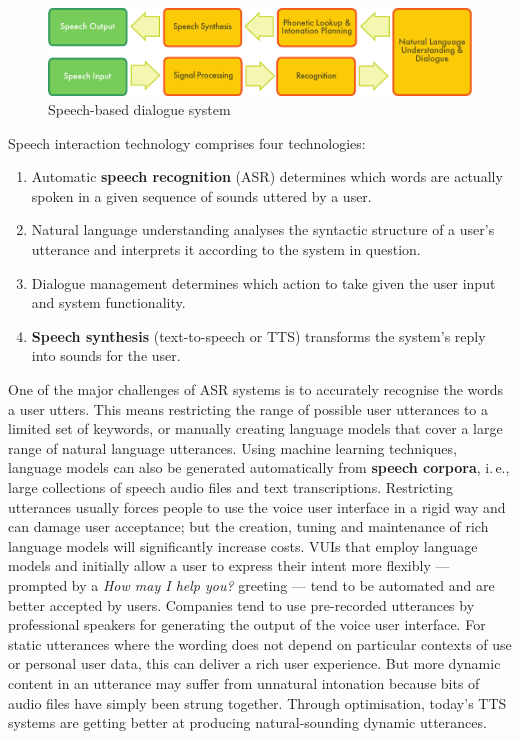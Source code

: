 \documentclass{../../metanetpaper}
\begin{document}
\begin{multicols}{2}
\begin{figure}[htb]
  \center
  \includegraphics[width=\textwidth]{../_media/english/simple_speech-based_dialogue_architecture}
  \caption{Speech-based dialogue system}
  \label{fig:dialoguearch_en}
\end{figure}

Speech interaction technology comprises four technologies: 

\begin{enumerate}
\item Automatic \textbf{speech recognition} (ASR) determines which words are actually spoken in a given sequence of sounds uttered by a user.  
\item Natural language understanding analyses the syntactic structure of a user’s utterance and interprets it according to the system in question.
\item Dialogue management determines which action to take given the user input and system functionality.   
\item \textbf{Speech synthesis} (text-to-speech or TTS) transforms the system’s reply into sounds for the user.
\end{enumerate}

One of the major challenges of ASR systems is to accurately recognise the words a user utters. This means restricting the range of possible user utterances to a limited set of keywords, or manually creating language models that cover a large range of natural language utterances. Using machine learning techniques, language models can also be generated automatically from \textbf{speech corpora}, i.\,e., large collections of speech audio files and text transcriptions. Restricting utterances usually forces people to use the voice user interface in a rigid way and can damage user acceptance; but the creation, tuning and maintenance of rich language models will significantly increase costs. VUIs that employ language models and initially allow a user to express their intent more flexibly — prompted by a \textit{How may I help you?} greeting — tend to be automated and are better accepted by users.
Companies tend to use pre-recorded utterances by professional speakers for generating the output of the voice user interface. For static utterances where the wording does not depend on particular contexts of use or personal user data, this can deliver a rich user experience. But more dynamic content in an utterance may suffer from unnatural intonation because bits of audio files have simply been strung together. Through optimisation, today’s TTS systems are getting better at producing natural-sounding dynamic utterances.


\end{multicols}
\end{document}
